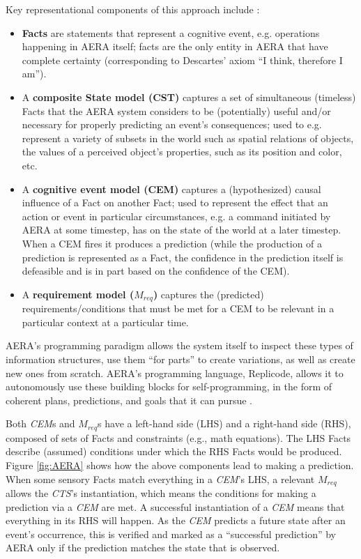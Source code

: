 \documentclass[runningheads]{llncs}
\begin{document}
Key representational components of this approach include \cite{sheikhlar2024autonomous,sheikhlar2024causal}: 
\begin{itemize}
	\item \textbf{Facts} are statements that represent a cognitive event, e.g. operations happening in AERA itself; facts are the only entity in AERA that have complete certainty (corresponding to Descartes' axiom “I think, therefore I am”).
	\item A \textbf{composite State model (CST)} captures a set of simultaneous (timeless) Facts that the AERA system considers to be (potentially) useful and/or necessary for properly predicting an event’s consequences; used to e.g. represent a variety of subsets in the world such as spatial relations of objects, the values of a perceived object’s properties, such as its position and color, etc. %
	\item A \textbf{cognitive event model (CEM)} captures a (hypothesized) causal influence of a Fact on another Fact; used to represent the effect that an action or event in particular circumstances, e.g. a command initiated by AERA at some timestep, has on the state of the world at a later timestep. When a CEM fires it produces a prediction (while the production of a prediction is represented as a Fact, the confidence in the prediction itself is defeasible and is in part based on the confidence of the CEM).
	\item A \textbf{requirement model ($M_{req}$)} captures the (predicted) requirements/\hspace{0pt}conditions that must be met for a CEM to be relevant in a particular context at a particular time.
%	
\end{itemize}

AERA’s programming paradigm allows the system itself to inspect these types of information structures, use them “for parts” to create variations, as well as create new ones from scratch. AERA’s programming language, Replicode, allows it to autonomously use these building blocks for self-programming, in the form of coherent plans, predictions, and goals that it can pursue \cite{nivel2013towards,nivel2013replicode,thorisson2012new}. 

Both \textit{CEM}s and $M_{req}$s have a left-hand side (LHS) and a right-hand side (RHS), composed of sets of Facts and constraints (e.g., math equations). The LHS Facts describe (assumed) conditions under which the RHS Facts would be produced. Figure \ref{fig:AERA} shows how the above components lead to making a prediction. When some sensory Facts match everything in a \textit{CEM}’s LHS, a relevant $M_{req}$ allows the \textit{CTS}’s instantiation, which means the conditions for making a prediction via a \textit{CEM} are met. A successful instantiation of a \textit{CEM} means that everything in its RHS will happen. 
As the \textit{CEM} predicts a future state after an event’s occurrence, this is verified and marked as a “successful prediction” by AERA only if the prediction matches the state that is observed.
\end{document}
